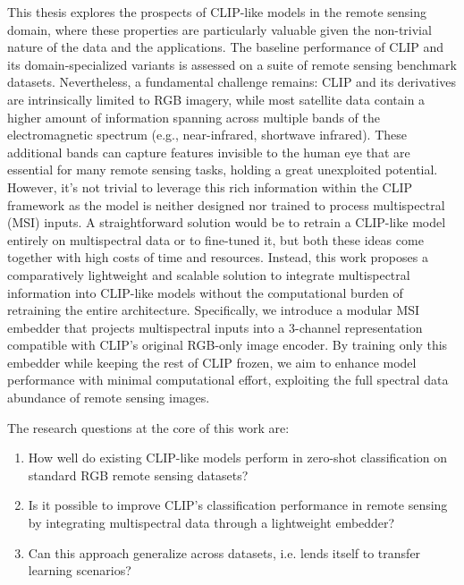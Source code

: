 \documentclass[a4paper, oneside, english]{sapthesis} %
\begin{document}
This thesis explores the prospects of CLIP-like models in the remote sensing domain, where these properties are particularly valuable given the non-trivial nature of the data and the applications. The baseline performance of CLIP and its domain-specialized variants \cite{liu2024remoteclip} \cite{zhang2024rs5m} \cite{wang2024skyscript} is assessed on a suite of remote sensing benchmark datasets. Nevertheless, a fundamental challenge remains: CLIP and its derivatives are intrinsically limited to RGB imagery, while most satellite data contain a higher amount of information spanning across multiple bands of the electromagnetic spectrum (e.g., near-infrared, shortwave infrared). These additional bands can capture features invisible to the human eye that are essential for many remote sensing tasks, holding a great unexploited potential. However, it's not trivial to leverage this rich information within the CLIP framework as the model is neither designed nor trained to process multispectral (MSI) inputs. A straightforward solution would be to retrain a CLIP-like model entirely on multispectral data \cite{marimo2025beyond} or to fine-tuned it, but both these ideas come together with high costs of time and resources. Instead, this work proposes a comparatively lightweight and scalable solution to integrate multispectral information into CLIP-like models without the computational burden of retraining the entire architecture. Specifically, we introduce a modular MSI embedder that projects multispectral inputs into a 3-channel representation compatible with CLIP's original RGB-only image encoder. By training only this embedder while keeping the rest of CLIP frozen, we aim to enhance model performance with minimal computational effort, exploiting the full spectral data abundance of remote sensing images.

The research questions at the core of this work are:

\begin{enumerate}
    \item How well do existing CLIP-like models perform in zero-shot classification on standard RGB remote sensing datasets?
    \item Is it possible to improve CLIP’s classification performance in remote sensing by integrating multispectral data through a lightweight embedder?
    \item Can this approach generalize across datasets, i.e. lends itself to transfer learning scenarios?
\end{enumerate}
\end{document}
